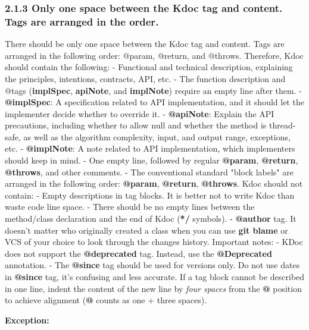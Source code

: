 \subsubsection*{\textbf{2.1.3 Only one space between the Kdoc tag and content. Tags are arranged in the order.}}
\leavevmode\newline
\label{sec:2.1.3}
There should be only one space between the Kdoc tag and content. Tags are arranged in the following order: @param, @return, and @throws.
Therefore, Kdoc should contain the following:
- Functional and technical description, explaining the principles, intentions, contracts, API, etc.
- The function description and @tags (\textbf{implSpec}, \textbf{apiNote}, and \textbf{implNote}) require an empty line after them.
- \textbf{@implSpec}: A specification related to API implementation, and it should let the implementer decide whether to override it.
- \textbf{@apiNote}: Explain the API precautions, including whether to allow null and whether the method is thread-safe, as well as the algorithm complexity, input, and output range, exceptions, etc.
- \textbf{@implNote}: A note related to API implementation, which implementers should keep in mind.
- One empty line, followed by regular \textbf{@param}, \textbf{@return}, \textbf{@throws}, and other comments.
- The conventional standard "block labels" are arranged in the following order: \textbf{@param}, \textbf{@return}, \textbf{@throws}.
Kdoc should not contain:
- Empty descriptions in tag blocks. It is better not to write Kdoc than waste code line space.
- There should be no empty lines between the method/class declaration and the end of Kdoc (\textbf{*/} symbols).
- \textbf{@author} tag. It doesn't matter who originally created a class when you can use \textbf{git blame} or VCS of your choice to look through the changes history.
Important notes:
- KDoc does not support the \textbf{@deprecated} tag. Instead, use the \textbf{@Deprecated} annotation.
- The \textbf{@since} tag should be used for versions only. Do not use dates in \textbf{@since} tag, it's confusing and less accurate.
If a tag block cannot be described in one line, indent the content of the new line by \textit{four spaces} from the \textbf{@} position to achieve alignment (\textbf{@} counts as one + three spaces).

\textbf{Exception:}

